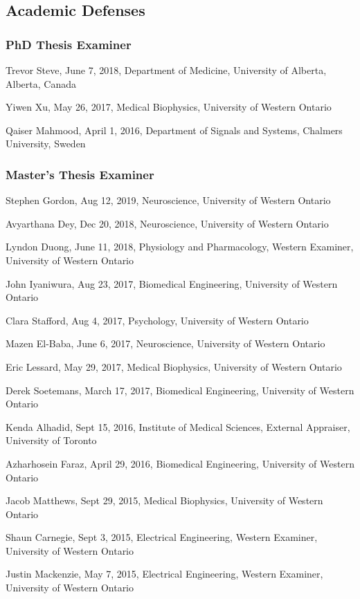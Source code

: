 \subsection*{Academic Defenses}

\subsubsection*{PhD Thesis Examiner}
\begin{packed_enum}
\item Trevor Steve, June 7, 2018, Department of Medicine, University of Alberta, Alberta, Canada
\item Yiwen Xu, May 26, 2017, Medical Biophysics, University of Western Ontario
\item Qaiser Mahmood, April 1, 2016, Department of Signals and Systems, Chalmers University, Sweden
\end{packed_enum}

\subsubsection*{Master's Thesis Examiner}
\begin{packed_enum}
\item Stephen Gordon, Aug 12, 2019, Neuroscience, University of Western Ontario
\item Avyarthana Dey, Dec 20, 2018, Neuroscience, University of Western Ontario
\item Lyndon Duong, June 11, 2018, Physiology and Pharmacology, Western Examiner, University of Western Ontario
\item John Iyaniwura, Aug 23, 2017, Biomedical Engineering, University of Western Ontario
\item Clara Stafford, Aug 4, 2017, Psychology, University of Western Ontario
\item Mazen El-Baba, June 6, 2017, Neuroscience, University of Western Ontario
\item Eric Lessard, May 29, 2017, Medical Biophysics, University of Western Ontario
\item Derek Soetemans, March 17, 2017, Biomedical Engineering, University of Western Ontario
\item Kenda Alhadid, Sept 15, 2016,  Institute of Medical Sciences, External Appraiser, University of Toronto
\item Azharhosein Faraz, April 29, 2016, Biomedical Engineering, University of Western Ontario
\item Jacob Matthews, Sept 29, 2015, Medical Biophysics, University of Western Ontario
\item Shaun Carnegie, Sept 3, 2015, Electrical Engineering, Western Examiner, University of Western Ontario
\item Justin Mackenzie, May 7, 2015, Electrical Engineering, Western Examiner, University of Western Ontario
\end{packed_enum}

